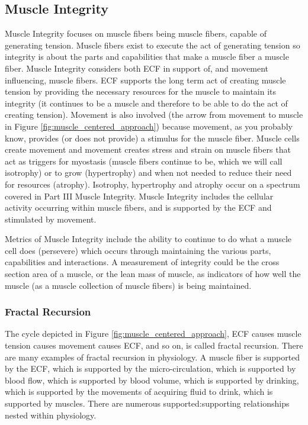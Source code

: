 \subsection{Muscle Integrity}
Muscle Integrity focuses on muscle fibers being muscle fibers, capable of generating tension. Muscle fibers exist to execute the act of generating tension so integrity is about the parts and capabilities that make a muscle fiber a muscle fiber. Muscle Integrity considers both ECF in support of, and movement influencing, muscle fibers. ECF supports the long term act of creating muscle tension by providing the necessary resources for the muscle to maintain its integrity (it continues to be a muscle and therefore to be able to do the act of creating tension). Movement is also involved (the arrow from movement to muscle in Figure \ref{fig:muscle_centered_approach}) because movement, as you probably know, provides (or does not provide) a stimulus for the muscle fiber. Muscle cells create movement and movement creates stress and strain on muscle fibers that act as triggers for myostasis (muscle fibers continue to be, which we will call isotrophy) or to grow (hypertrophy) and when not needed to reduce their need for resources (atrophy). Isotrophy, hypertrophy and atrophy occur on a spectrum covered in Part III Muscle Integrity. Muscle Integrity includes the cellular activity occurring within muscle fibers, and is supported by the ECF and stimulated by movement.

Metrics of Muscle Integrity include the ability to continue to do what a muscle cell does (persevere) which occurs through maintaining the various parts, capabilities and interactions. A measurement of integrity could be the cross section area of a muscle, or the lean mass of muscle, as indicators of how well the muscle (as a muscle collection of muscle fibers) is being maintained.

\subsubsection{Fractal Recursion}
The cycle depicted in Figure \ref{fig:muscle_centered_approach}, ECF causes muscle tension causes movement causes ECF, and so on, is called fractal recursion. There are many examples of fractal recursion in physiology. A muscle fiber is supported by the ECF, which is supported by the micro-circulation, which is supported by blood flow, which is supported by blood volume, which is supported by drinking, which is supported by the movements of acquiring fluid to drink, which is supported by muscles. There are numerous supported:supporting relationships nested within physiology.

